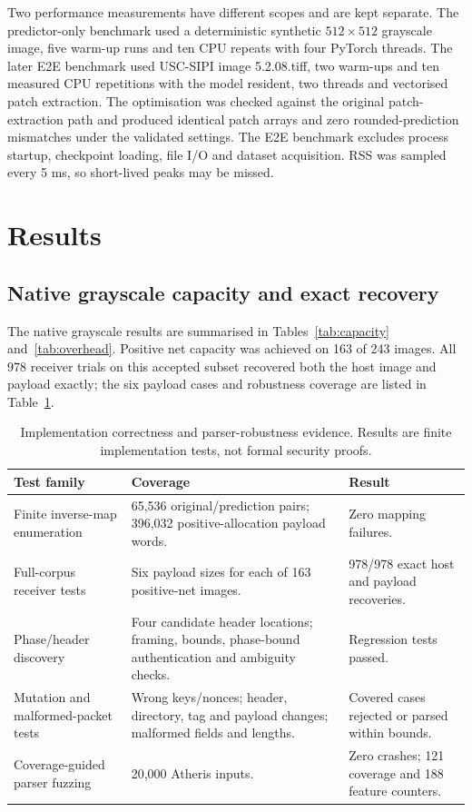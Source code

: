 \documentclass[preprint,12pt,a4paper]{elsarticle}
\begin{document}
Two performance measurements have different scopes and are kept separate. The predictor-only benchmark used a deterministic synthetic $512\times512$ grayscale image, five warm-up runs and ten CPU repeats with four PyTorch threads. The later E2E benchmark used USC-SIPI image 5.2.08.tiff, two warm-ups and ten measured CPU repetitions with the model resident, two threads and vectorised patch extraction. The optimisation was checked against the original patch-extraction path and produced identical patch arrays and zero rounded-prediction mismatches under the validated settings. The E2E benchmark excludes process startup, checkpoint loading, file I/O and dataset acquisition. RSS was sampled every 5 ms, so short-lived peaks may be missed.

\section{Results}
\label{sec:results}

\subsection{Native grayscale capacity and exact recovery}

The native grayscale results are summarised in Tables~\ref{tab:capacity} and~\ref{tab:overhead}. Positive net capacity was achieved on 163 of 243 images. All 978 receiver trials on this accepted subset recovered both the host image and payload exactly; the six payload cases and robustness coverage are listed in Table~\ref{tab:robustness}.

\begin{table}[t]
\centering
\caption{Implementation correctness and parser-robustness evidence. Results are finite implementation tests, not formal security proofs.}
\label{tab:robustness}
\scriptsize
\begin{tabularx}{\textwidth}{p{3.0cm}p{7.5cm}X}
\toprule
Test family & Coverage & Result\\
\midrule
Finite inverse-map enumeration & 65,536 original/prediction pairs; 396,032 positive-allocation payload words. & Zero mapping failures.\\
Full-corpus receiver tests & Six payload sizes for each of 163 positive-net images. & 978/978 exact host and payload recoveries.\\
Phase/header discovery & Four candidate header locations; framing, bounds, phase-bound authentication and ambiguity checks. & Regression tests passed.\\
Mutation and malformed-packet tests & Wrong keys/nonces; header, directory, tag and payload changes; malformed fields and lengths. & Covered cases rejected or parsed within bounds.\\
Coverage-guided parser fuzzing & 20,000 Atheris inputs. & Zero crashes; 121 coverage and 188 feature counters.\\
\bottomrule
\end{tabularx}
\end{table}
\end{document}

